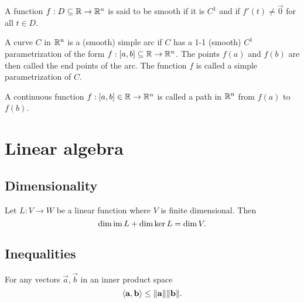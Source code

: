 \documentclass{article}
\begin{document}
\begin{definition}
    A function $f: D \subseteq \mathbb{R} \rightarrow \mathbb{R}^n$ is said to be smooth if it is
    $C^1$ and if $f'(t) \neq \vec{0}$ for all $t \in D$.
\end{definition}

\begin{definition}
    A curve $C$ in $\mathbb{R}^n$ is a (smooth) simple arc if $C$ has a 1-1
    (smooth) $C^1$ parametrization of the form $f: [a, b] \subseteq \mathbb{R} \rightarrow \mathbb{R}^n$.
    The points $f(a)$ and $f(b)$ are then called the end points of the arc.
    The function $f$ is called a simple parametrization of $C$.
\end{definition}

\begin{definition}[Path]
    A continuous function $f: [a, b] \in \mathbb{R} \rightarrow \mathbb{R}^n$ is called a
    path in $\mathbb{R}^n$ from $f(a)$ to $f(b)$.
\end{definition}

\section{Linear algebra}

\subsection{Dimensionality}
\begin{theorem}
    Let $L: V \rightarrow W$ be a linear function
    where $V$ is finite dimensional. Then
    \begin{equation}
        \dim \operatorname{im} L + \dim \ker L = \dim V.
    \end{equation}
\end{theorem}
\subsection{Inequalities}


\begin{theorem}
    For any vectors $\vec{a}, \vec{b}$ in an inner product space
    \begin{equation}
        \langle\mathbf{a}, \mathbf{b}\rangle \leq \lVert\mathbf{a}\rVert \lVert\mathbf{b}\rVert.
    \end{equation}
\end{theorem}
\end{document}
